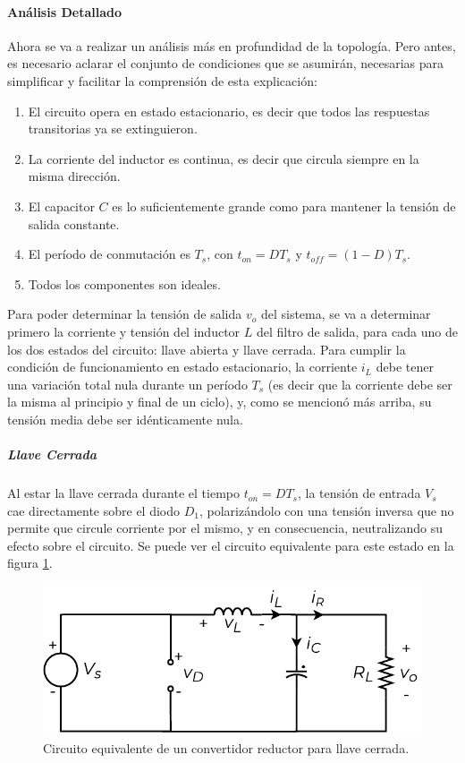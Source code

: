 \paragraph{Análisis Detallado}

Ahora se va a realizar un análisis más en profundidad de la topología. Pero antes, es necesario aclarar el conjunto de condiciones que se asumirán, necesarias para simplificar y facilitar la comprensión de esta explicación:

\begin{enumerate}
    \item El circuito opera en estado estacionario, es decir que todos las respuestas transitorias ya se extinguieron.
    \item La corriente del inductor es continua, es decir que circula siempre en la misma dirección.
    \item El capacitor $C$ es lo suficientemente grande como para mantener la tensión de salida constante.
    \item El período de conmutación es $T_s$, con $t_{on} = DT_s$ y $t_{off} = (1-D)T_s$.
    \item Todos los componentes son ideales.
\end{enumerate}

Para poder determinar la tensión de salida $v_o$ del sistema, se va a determinar primero la corriente y tensión del inductor $L$ del filtro de salida, para cada uno de los dos estados del circuito: {\Medium llave abierta} y {\Medium llave cerrada}. Para cumplir la condición de funcionamiento en estado estacionario, la corriente $i_L$ debe tener una variación total nula durante un período $T_s$ (es decir que la corriente debe ser la misma al principio y final de un ciclo), y, como se mencionó más arriba, su tensión media debe ser idénticamente nula.\\

\subparagraph{Llave Cerrada}

Al estar la llave cerrada durante el tiempo $t_{on} = DT_s$, la tensión de entrada $V_s$ cae directamente sobre el diodo $D_1$, polarizándolo con una tensión inversa que no permite que circule corriente por el mismo, y en consecuencia, neutralizando su efecto sobre el circuito. Se puede ver el circuito equivalente para este estado en la figura \ref{reductor_llave_cerrada}.\\

\begin{figure}[h]
    \centering
    \includegraphics[scale=0.6]{Imagenes/Reductor Llave Cerrada.pdf}
    \caption{Circuito equivalente de un convertidor reductor para llave cerrada.}
    \label{reductor_llave_cerrada}
\end{figure}

